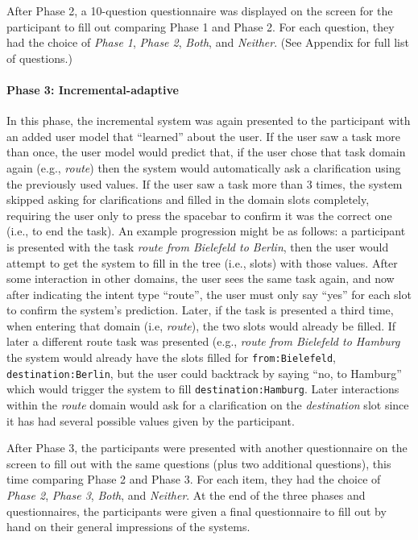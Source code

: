 \documentclass[11pt]{article}
\begin{document}
After Phase 2, a 10-question questionnaire was displayed on the screen for the participant to fill out comparing Phase 1 and Phase 2. For each question, they had the choice of \emph{Phase 1}, \emph{Phase 2}, \emph{Both}, and \emph{Neither}. (See Appendix for full list of questions.) 

\paragraph{Phase 3: Incremental-adaptive} In this phase, the incremental system was again presented to the participant with an added user model that ``learned'' about the user. If the user saw a task more than once, the user model would predict that, if the user chose that task domain again (e.g., \emph{route}) then the system would automatically ask a clarification using the previously used values. If the user saw a task more than 3 times, the system skipped asking for clarifications and filled in the domain slots completely, requiring the user only to press the spacebar to confirm it was the correct one (i.e., to end the task). An example progression might be as follows: a participant is presented with the task \emph{route from Bielefeld to Berlin}, then the user would attempt to get the system to fill in the tree (i.e., slots) with those values. After some interaction in other domains, the user sees the same task again, and now after indicating the intent type ``route'', the user must only say ``yes'' for each slot to confirm the system's prediction. Later, if the task is presented a third time, when entering that domain (i.e, \emph{route}), the two slots would already be filled. If later a different route task was presented (e.g., \emph{route from Bielefeld to Hamburg} the system would already have the slots filled for \texttt{from:Bielefeld}, \texttt{destination:Berlin}, but the user could backtrack by saying ``no, to Hamburg'' which would trigger the system to fill \texttt{destination:Hamburg}. Later interactions within the \emph{route} domain would ask for a clarification on the \emph{destination} slot since it has had several possible values given by the participant. 

After Phase 3, the participants were presented with another questionnaire on the screen to fill out with the same questions (plus two additional questions), this time comparing Phase 2 and Phase 3. For each item, they had the choice of \emph{Phase 2}, \emph{Phase 3}, \emph{Both}, and \emph{Neither}. At the end of the three phases and questionnaires, the participants were given a final questionnaire to fill out by hand on their general impressions of the systems. 
\end{document}

